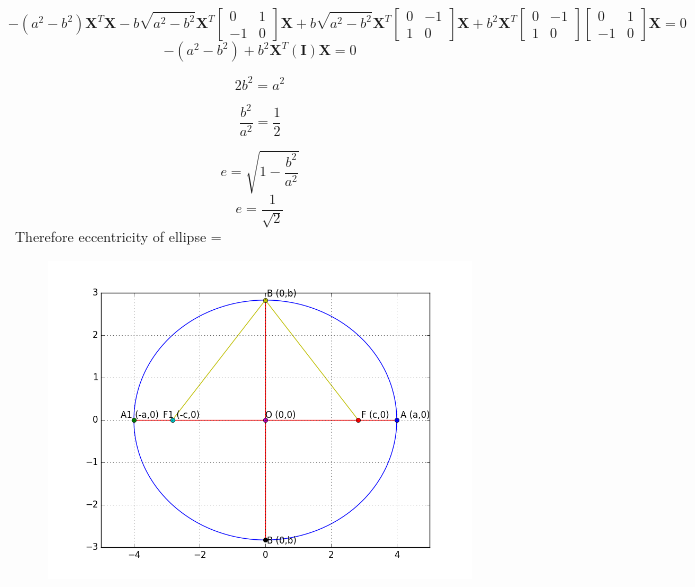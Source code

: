 \documentclass{beamer}
\begin{document}
\begin{frame}

\newline
\newline
\newline
\implies
\[-(a^{2}-b^{2})\textbf{X}^{T}\textbf{X} - b\sqrt{a^{2}-b^{2}}\textbf{X}^{T}\begin{bmatrix}
0 & 1 \\
-1 & 0
\end{bmatrix}\textbf{X} + b\sqrt{a^{2}-b^{2}}\textbf{X}^{T}\begin{bmatrix}
0 & -1 \\
1 & 0
\end{bmatrix}\textbf{X} + b^{2}\textbf{X}^{T}\begin{bmatrix}
0 & -1 \\
1 & 0
\end{bmatrix}\begin{bmatrix}
0 & 1 \\
-1 & 0
\end{bmatrix}\textbf{X} = 0\]
\newline
\newline
\newline
\implies
\[-(a^{2}-b^{2}) + b^{2}\textbf{X}^{T}(\textbf{I})\textbf{X}=0\]
\newline



\end{frame}
\begin{frame}


\[2b^{2} = a^{2}\]
\newline


\[\dfrac{b^{2}}{a^{2}} = \frac{1}{2}\]
\newline


\[e=\sqrt{1-\dfrac{b^{2}}{a^{2}}}\]
\newline
\[e=\dfrac{1}{\sqrt{2}}\]
\newline
\ Therefore eccentricity of ellipse =




\end{frame}
\begin{frame}

\begin{figure}
\includegraphics[width=\linewidth]{Avinash.png}
\end{figure}


\end{frame}
\end{document}
